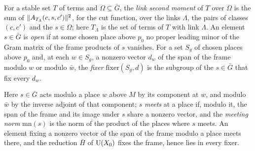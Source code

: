 For a stable set $T$ of terms and $\Omega\subseteq\bar G$, the \emph{link second moment} of $T$ over $\Omega$ is the sum of $\lVert A_{T_\Lambda}(c,s,c')\rVert^2$, for the cut function, over the
links $\Lambda$, the pairs of classes $(c,c')$ and the $s\in\Omega$; here $T_\Lambda$ is the set of terms of $T$ with link $\Lambda$. An element $s\in\bar G$ is \emph{open} if at some chosen place
above $p_0$ no proper leading minor of the Gram matrix of the frame products of $s$ vanishes. For a set $S_g$ of chosen places above $p_0$ and, at each $w\in S_g$, a nonzero vector $d_w$ of
the span of the frame modulo $w$ or modulo $\bar w$, the \emph{fixer} $\mathrm{fixer}(S_g,d)$ is the subgroup of the $s\in\bar G$ that fix every $d_w$.

Here $s\in\bar G$ acts modulo a place $w$ above $M$ by its component at $w$, and modulo $\bar w$ by the inverse adjoint of that component; $s$ \emph{meets} at a place if, modulo it, the span of the frame and its image under $s$ share a nonzero
vector, and the \emph{meeting norm} $\mathrm{mn}(s)$ is the norm of the product of the places where $s$ meets. An element fixing a nonzero vector of the span of the frame modulo a place meets there, and the reduction $\bar H$ of $\operatorname{U}(X_0)$ fixes the
frame, hence lies in every fixer.

